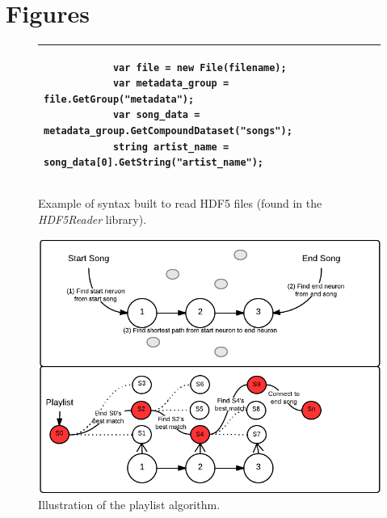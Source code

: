 \section{Figures} %
\label{sec:list_of_figures}


\begin{figure}[h!]
	\begin{tabular}{|p{\textwidth}|}
		\hline
		\begin{verbatim}
			var file = new File(filename);
			var metadata_group = file.GetGroup("metadata");
			var song_data = metadata_group.GetCompoundDataset("songs");
			string artist_name = song_data[0].GetString("artist_name");
		\end{verbatim} \\
		\hline
	\end{tabular}
	\caption{Example of syntax built to read HDF5 files (found in the \emph{HDF5Reader} library).}
    \label{fig:hdf5-syntax}
\end{figure}

\vspace{2.3cm}
\begin{figure}[h!]
	\centering
	\includegraphics[width=\textwidth]{figures/playlist-generation}
	\caption{Illustration of the playlist algorithm.}
    \label{fig:playlist-gen}
\end{figure}

\newpage

